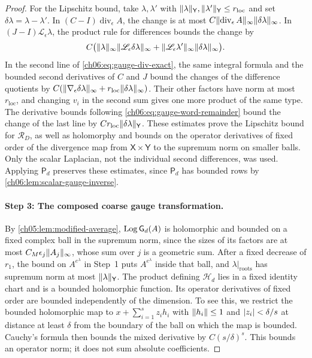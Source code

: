 \begin{proof}
For the Lipschitz bound, take $\lambda,\lambda'$ with $\lVert \lambda\rVert_{\mathsf Y},\lVert \lambda'\rVert_{\mathsf Y}\le r_{\mathrm{loc}}$ and set $\delta\lambda=\lambda-\lambda'$. In $(C-I)\operatorname{div}_\epsilon A$, the change is at most $C\lVert \operatorname{div}_\epsilon A\rVert_\infty\lVert \delta\lambda\rVert_\infty$. In $(J-I)\mathscr L_\epsilon\lambda$, the product rule for differences bounds the change by
\[
 C\bigl(\lVert \lambda\rVert_\infty\lVert \mathscr L_\epsilon\delta\lambda\rVert_\infty+\lVert \mathscr L_\epsilon\lambda'\rVert_\infty\lVert \delta\lambda\rVert_\infty\bigr).
\]
In the second line of \eqref{ch06:eq:gauge-div-exact}, the same integral formula and the bounded second derivatives of $C$ and $J$ bound the changes of the difference quotients by $C(\lVert \nabla_\epsilon\delta\lambda\rVert_\infty+r_{\mathrm{loc}}\lVert \delta\lambda\rVert_\infty)$. Their other factors have norm at most $r_{\mathrm{loc}}$, and changing $v_i$ in the second sum gives one more product of the same type. The derivative bounds following \eqref{ch06:eq:gauge-word-remainder} bound the change of the last line by $Cr_{\mathrm{loc}}\lVert \delta\lambda\rVert_{\mathsf Y}$. These estimates prove the Lipschitz bound for $\mathscr R_D$, as well as holomorphy and bounds on the operator derivatives of fixed order of the divergence map from $\mathsf X\times\mathsf Y$ to the supremum norm on smaller balls. Only the scalar Laplacian, not the individual second differences, was used. Applying $\mathsf P_d$ preserves these estimates, since $\mathsf P_d$ has bounded rows by \cref{ch06:lem:scalar-gauge-inverse}.

\paragraph{Step 3: The composed coarse gauge transformation.}
By \cref{ch05:lem:modified-average}, $\operatorname{Log}\mathsf G_d(A)$ is holomorphic and bounded on a fixed complex ball in the supremum norm, since the sizes of its factors are at most $C_M\epsilon_j\lVert A_j\rVert_\infty$, whose sum over $j$ is a geometric sum. After a fixed decrease of $r_1$, the bound on $A^{e^\lambda}$ in Step~1 puts $A^{e^\lambda}$ inside that ball, and $\lambda|_{\mathrm{roots}}$ has supremum norm at most $\lVert \lambda\rVert_{\mathsf Y}$. The product defining $\mathscr H_d$ lies in a fixed identity chart and is a bounded holomorphic function. Its operator derivatives of fixed order are bounded independently of the dimension. To see this, we restrict the bounded holomorphic map to $x+\sum_{i=1}^sz_ih_i$ with $\lVert h_i\rVert\le1$ and $\lvert z_i\rvert<\delta/s$ at distance at least $\delta$ from the boundary of the ball on which the map is bounded. Cauchy's formula then bounds the mixed derivative by $C(s/\delta)^s$. This bounds an operator norm; it does not sum absolute coefficients.


\end{proof}
